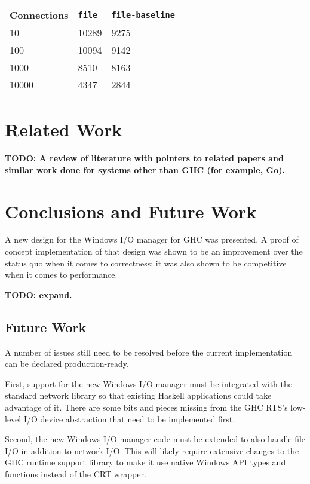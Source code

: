 \documentclass[a4paper,11pt,oneside]{report}
\begin{document}
\begin{center}
\begin{tabular}{ | l | l | l | }
  \hline
  Connections & \texttt{file} & \texttt{file-baseline} \\
  \hline
  10 & 10289 & 9275 \\
  \hline
  100 & 10094 & 9142 \\
  \hline
  1000 & 8510 & 8163 \\
  \hline
  10000 & 4347 & 2844 \\
  \hline
\end{tabular}
\end{center}


\chapter{Related Work}
\label{chap:related-work}

\textbf{TODO: A review of literature with pointers to related papers and similar
  work done for systems other than GHC (for example, Go). }


\chapter{Conclusions and Future Work}
\label{chap:conclusions}

A new design for the Windows I/O manager for GHC was presented. A proof of
concept implementation of that design was shown to be an improvement over the
status quo when it comes to correctness; it was also shown to be competitive
when it comes to performance.

\textbf{TODO: expand.}

\section{Future Work}

A number of issues still need to be resolved before the current implementation
can be declared production-ready.

First, support for the new Windows I/O manager must be integrated with the
standard network library so that existing Haskell applications could take
advantage of it. There are some bits and pieces missing from the GHC RTS's
low-level I/O device abstraction that need to be implemented first.

Second, the new Windows I/O manager code must be extended to also handle file
I/O in addition to network I/O. This will likely require extensive changes to
the GHC runtime support library to make it use native Windows API types and
functions instead of the CRT wrapper.
\end{document}
